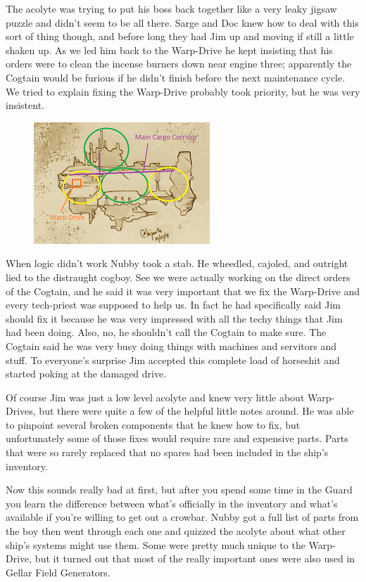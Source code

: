 The acolyte was trying to put his boss back together like a very leaky jigsaw puzzle and didn’t seem to be all there. 
Sarge and Doc knew how to deal with this sort of thing though, and before long they had Jim up and moving if still a little shaken up. 
As we led him back to the Warp-Drive he kept insisting that his orders were to clean the incense burners down near engine three; 
apparently the Cogtain would be furious if he didn’t finish before the next maintenance cycle. 
We tried to explain fixing the Warp-Drive probably took priority, but he was very insistent.

\begin{figure}
	\begin{center}
		\includegraphics[width=\figwidth]{pics/7/25.png}
	\end{center}
\end{figure}
When logic didn’t work Nubby took a stab. 
He wheedled, cajoled, and outright lied to the distraught cogboy. 
See we were actually working on the direct orders of the Cogtain, and he said it was very important that we fix the Warp-Drive and every tech-priest was supposed to help us. 
In fact he had specifically said Jim should fix it because he was very impressed with all the techy things that Jim had been doing. 
Also, no, he shouldn’t call the Cogtain to make sure. 
The Cogtain said he was very busy doing things with machines and servitors and stuff. 
To everyone’s surprise Jim accepted this complete load of horseshit and started poking at the damaged drive.

Of course Jim was just a low level acolyte and knew very little about Warp-Drives, but there were quite a few of the helpful little notes around. 
He was able to pinpoint several broken components that he knew how to fix, but unfortunately some of those fixes would require rare and expensive parts. 
Parts that were so rarely replaced that no spares had been included in the ship’s inventory.

Now this sounds really bad at first, but after you spend some time in the Guard you learn the difference between what’s officially in the inventory and what’s available if you’re willing to get out a crowbar. 
Nubby got a full list of parts from the boy then went through each one and quizzed the acolyte about what other ship’s systems might use them. 
Some were pretty much unique to the Warp-Drive, but it turned out that most of the really important ones were also used in Gellar Field Generators.

